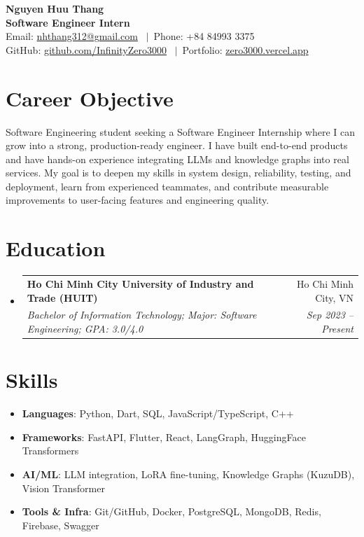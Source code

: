 \documentclass[letterpaper,11pt]{article}
\makeatletter
\newcommand{\resumeSubheading}[4]{
  \vspace{-1pt}\item
    \begin{tabular*}{0.97\textwidth}{l@{\extracolsep{\fill}}r}
      \textbf{#1} & #2 \\
      \textit{\small#3} & \textit{\small #4} \\
    \end{tabular*}\vspace{-5pt}
}
\newcommand{\resumeSubHeadingListStart}{\begin{itemize}[leftmargin=*]}
\newcommand{\resumeSubHeadingListEnd}{\end{itemize}}
\makeatother
\begin{document}
\begin{center}
    {\Huge \textbf{Nguyen Huu Thang}} \\[6pt]
    {\large \textbf{Software Engineer Intern}} \\[10pt]

    Email: \href{mailto:nhthang312@gmail.com}{nhthang312@gmail.com}
    \ $|$\ 
    Phone: +84 84993 3375
    \\ 
    GitHub: \href{https://github.com/InfinityZero3000}{github.com/InfinityZero3000}
    \ $|$\ 
    Portfolio: \href{https://zero.vercel.app}{zero3000.vercel.app}
\end{center}

\section{Career Objective}
Software Engineering student seeking a Software Engineer Internship where I can grow into a strong, production-ready engineer. I have built end-to-end products and have hands-on experience integrating LLMs and knowledge graphs into real services. My goal is to deepen my skills in system design, reliability, testing, and deployment, learn from experienced teammates, and contribute measurable improvements to user-facing features and engineering quality.

\section{Education}
  \resumeSubHeadingListStart
    \resumeSubheading
      {Ho Chi Minh City University of Industry and Trade (HUIT)}{Ho Chi Minh City, VN}
      {Bachelor of Information Technology; Major: Software Engineering; GPA: 3.0/4.0}{Sep 2023 -- Present}
  \resumeSubHeadingListEnd

\section{Skills}
 \resumeSubHeadingListStart
    \item{
     \textbf{Languages}{: Python, Dart, SQL, JavaScript/TypeScript, C++}
    }
    \item{
     \textbf{Frameworks}{: FastAPI, Flutter, React, LangGraph, HuggingFace Transformers}
    }
    \item{
     \textbf{AI/ML}{: LLM integration, LoRA fine-tuning, Knowledge Graphs (KuzuDB), Vision Transformer }
    }
    \item{
     \textbf{Tools \& Infra}{: Git/GitHub, Docker, PostgreSQL, MongoDB, Redis, Firebase, Swagger}
    }
 \resumeSubHeadingListEnd
\end{document}
